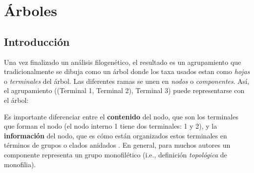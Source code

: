 \chapter{\'Arboles}
\label{cha:arboles}


\section*{Introducci\'on}

Una vez finalizado un an\'alisis filogen\'etico, el resultado es un agrupamiento que tradicionalmente se dibuja como un \'arbol donde los taxa usados estan como \emph{hojas} o \emph{terminales} del \'arbol. Las diferentes ramas se unen en \emph{nodos} o \emph{componentes}. As\'i, el agrupamiento ((Terminal 1, Terminal 2), Terminal 3) puede representarse con el \'arbol:

\begin{center}
%
%
\end{center}

Es importante diferenciar entre el \textbf{contenido} del nodo, que son los terminales que forman el nodo (el nodo interno 1 tiene dos terminales: 1 y 2), y la \textbf{informaci\'on} del nodo, que es c\'omo est\'an organizados estos terminales en t\'erminos de grupos o clados anidados \cite{Nelson1979}. En general, para muchos autores un componente representa un grupo monofil\'etico (i.e., definici\'on \emph{topol\'ogica} de monofilia).

